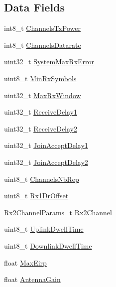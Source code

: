 \subsection*{Data Fields}
\begin{DoxyCompactItemize}
\item 
int8\+\_\+t \hyperlink{structsLoRaMacParams_a3e7d1d54a64dc76539c12e1dd3cc316f}{Channels\+Tx\+Power}
\item 
int8\+\_\+t \hyperlink{structsLoRaMacParams_a4c69ccb4d47d2dd72248d66671a64d06}{Channels\+Datarate}
\item 
uint32\+\_\+t \hyperlink{structsLoRaMacParams_a8ec7fc06c76a9ad6b56ee20c77540dcd}{System\+Max\+Rx\+Error}
\item 
uint8\+\_\+t \hyperlink{structsLoRaMacParams_a59098e239afcb8f7897d10f37ee64625}{Min\+Rx\+Symbols}
\item 
uint32\+\_\+t \hyperlink{structsLoRaMacParams_a1cc6077f5089f55803c7eaa73ddd594c}{Max\+Rx\+Window}
\item 
uint32\+\_\+t \hyperlink{structsLoRaMacParams_a6f54a81f03cdffceec50e3cf9cc83228}{Receive\+Delay1}
\item 
uint32\+\_\+t \hyperlink{structsLoRaMacParams_a587f62a64ee82e29e260a3ea1acaa156}{Receive\+Delay2}
\item 
uint32\+\_\+t \hyperlink{structsLoRaMacParams_a80aa9bf077423697b47b22afb6dde729}{Join\+Accept\+Delay1}
\item 
uint32\+\_\+t \hyperlink{structsLoRaMacParams_a42335ca2034e1352546d473fb0b917a8}{Join\+Accept\+Delay2}
\item 
uint8\+\_\+t \hyperlink{structsLoRaMacParams_aa96ac22c28fad8318dcdffe58c893210}{Channels\+Nb\+Rep}
\item 
uint8\+\_\+t \hyperlink{structsLoRaMacParams_acb99a582d1fb1b6b744d965b93006eed}{Rx1\+Dr\+Offset}
\item 
\hyperlink{group__LORAMAC_ga8f57f29481ea92c24f6af04b96a95e0f}{Rx2\+Channel\+Params\+\_\+t} \hyperlink{structsLoRaMacParams_a10ca1854770d376f3b35aff131739378}{Rx2\+Channel}
\item 
uint8\+\_\+t \hyperlink{structsLoRaMacParams_afa2a5ecb973c489cfcf5e6a0f7d28ab3}{Uplink\+Dwell\+Time}
\item 
uint8\+\_\+t \hyperlink{structsLoRaMacParams_aec937b2400c0214e760f830ad4f40b48}{Downlink\+Dwell\+Time}
\item 
float \hyperlink{structsLoRaMacParams_a5f2cfed6f5c51de287017c30da2f953a}{Max\+Eirp}
\item 
float \hyperlink{structsLoRaMacParams_a5a9de6bfd5a7ce1885db4f4029b55cd5}{Antenna\+Gain}
\end{DoxyCompactItemize}


